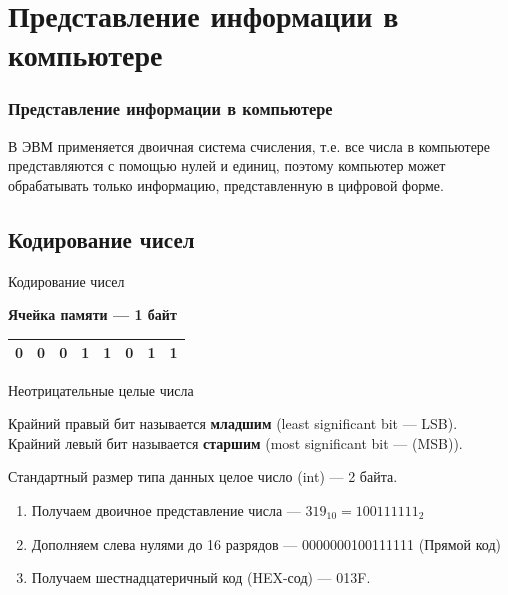 \section{Представление информации в компьютере}
\begin{frame}
\frametitle{Представление информации в компьютере}


В ЭВМ применяется двоичная система счисления, т.е. все числа в компьютере представляются с помощью нулей и единиц, поэтому компьютер может обрабатывать только информацию, представленную в цифровой форме.




\end{frame}

 \subsection{Кодирование чисел}
\begin{frame}{Кодирование чисел}

\textbf{Ячейка памяти --- 1 байт}
\begin{table}
	\centering
		\begin{tabular}{|c|c|c|c|c|c|c|c|}\hline
		  0 & 0 & 0 & 1 & 1 & 0 & 1 & 1\\ 
		\hline
		\end{tabular}
\end{table}

\end{frame}


\begin{frame}{Неотрицательные целые числа}

Крайний правый бит называется \textbf{младшим} (least significant bit --- LSB).\\
Крайний левый бит называется \textbf{старшим} (most significant bit --- (MSB)).

Стандартный размер типа данных целое число (int) --- 2 байта.
\begin{enumerate}
\item{Получаем двоичное представление числа --- $319_{10}=100111111_2$}
\item{Дополняем слева нулями до 16 разрядов --- 0000000100111111 (Прямой код)}
\item{Получаем шестнадцатеричный код (HEX-сод) --- 013F.}
\end{enumerate}
\end{frame}

